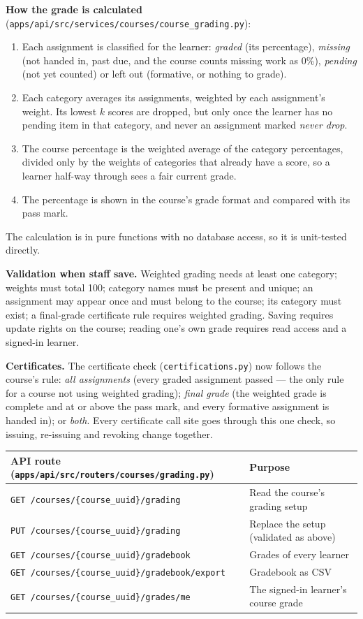 \documentclass[11pt,a4paper]{article}
\newcommand{\fp}[1]{\nolinkurl{#1}}
\begin{document}
\textbf{How the grade is calculated} (\fp{apps/api/src/services/courses/course_grading.py}):
\begin{enumerate}
  \item Each assignment is classified for the learner: \emph{graded} (its percentage), \emph{missing}
        (not handed in, past due, and the course counts missing work as 0\%), \emph{pending} (not yet
        counted) or left out (formative, or nothing to grade).
  \item Each category averages its assignments, weighted by each assignment's weight. Its lowest
        $k$ scores are dropped, but only once the learner has no pending item in that category, and
        never an assignment marked \emph{never drop}.
  \item The course percentage is the weighted average of the category percentages, divided only by
        the weights of categories that already have a score, so a learner half-way through sees a fair
        current grade.
  \item The percentage is shown in the course's grade format and compared with its pass mark.
\end{enumerate}
The calculation is in pure functions with no database access, so it is unit-tested directly.

\textbf{Validation when staff save.} Weighted grading needs at least one category; weights must total
100; category names must be present and unique; an assignment may appear once and must belong to the
course; its category must exist; a final-grade certificate rule requires weighted grading. Saving
requires update rights on the course; reading one's own grade requires read access and a signed-in
learner.

\textbf{Certificates.} The certificate check (\fp{certifications.py}) now follows the course's rule:
\emph{all assignments} (every graded assignment passed — the only rule for a course not using weighted
grading); \emph{final grade} (the weighted grade is complete and at or above the pass mark, and every
formative assignment is handed in); or \emph{both}. Every certificate call site goes through this one
check, so issuing, re-issuing and revoking change together.

\begin{xltabular}{\textwidth}{L{0.42\textwidth}Y}
\toprule
\textbf{API route} (\fp{apps/api/src/routers/courses/grading.py}) & \textbf{Purpose} \\
\midrule
\texttt{GET /courses/\{course\_uuid\}/grading} & Read the course's grading setup \\
\texttt{PUT /courses/\{course\_uuid\}/grading} & Replace the setup (validated as above) \\
\texttt{GET /courses/\{course\_uuid\}/gradebook} & Grades of every learner \\
\texttt{GET /courses/\{course\_uuid\}/gradebook/export} & Gradebook as CSV \\
\texttt{GET /courses/\{course\_uuid\}/grades/me} & The signed-in learner's course grade \\
\bottomrule
\end{xltabular}
\end{document}
